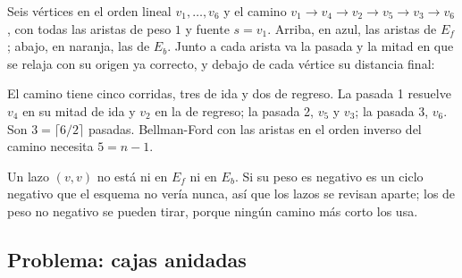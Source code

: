 \documentclass[11pt,letterpaper]{article}
\begin{document}
\begin{ejemplo}
  \label{ej:caminos-yen}
  Seis vértices en el orden lineal $v_1, \dots, v_6$ y el camino
  $v_1 \to v_4 \to v_2 \to v_5 \to v_3 \to v_6$, con todas las aristas
  de peso $1$ y fuente $s = v_1$. Arriba, en azul, las aristas de
  $E_f$; abajo, en naranja, las de $E_b$. Junto a cada arista va la
  pasada y la mitad en que se relaja con su origen ya correcto, y
  debajo de cada vértice su distancia final:
  \begin{center}
  \end{center}
  El camino tiene cinco corridas, tres de ida y dos de regreso. La
  pasada 1 resuelve $v_4$ en su mitad de ida y $v_2$ en la de regreso;
  la pasada 2, $v_5$ y $v_3$; la pasada 3, $v_6$. Son
  $3 = \lceil 6/2 \rceil$ pasadas. Bellman-Ford con las aristas en el
  orden inverso del camino necesita $5 = n - 1$.
\end{ejemplo}

\begin{ojo}
  Un lazo $(v, v)$ no está ni en $E_f$ ni en $E_b$. Si su peso es
  negativo es un ciclo negativo que el esquema no vería nunca, así que
  los lazos se revisan aparte; los de peso no negativo se pueden
  tirar, porque ningún camino más corto los usa.
\end{ojo}


\subsection*{Problema: cajas anidadas}
\end{document}
